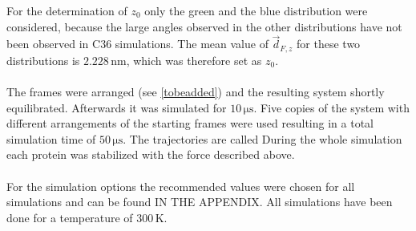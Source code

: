 For the determination of $z_0$ only the green and the blue distribution were considered, because the large angles observed in the other distributions have not been observed in C36 simulations. The mean value of $\vec{d}_{F, z}$ for these two distributions is $2.228\,\si{\nano\metre}$, which was therefore set as $z_0$.\\
\\
The frames were arranged (see \autoref{tobeadded}) and the resulting system shortly equilibrated. Afterwards it was simulated for $10\,\si{\micro\second}$. Five copies of the system with different arrangements of the starting frames were used resulting in a total simulation time of  $50\,\si{\micro\second}$. The trajectories are called During the whole simulation each protein was stabilized with the force described above.\\
\\
For the simulation options the recommended values were chosen for all simulations and can be found IN THE APPENDIX. All simulations have been done for a temperature of $300\,\si{\kelvin}$.